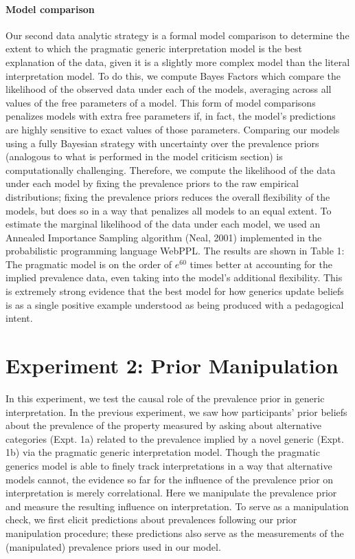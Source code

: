 \documentclass[floatsintext,doc]{apa6}
\let\oldparagraph\paragraph
\renewcommand{\paragraph}[1]{\oldparagraph{#1}\mbox{}}
\begin{document}
\hypertarget{model-comparison}{%
\paragraph{Model comparison}\label{model-comparison}}

Our second data analytic strategy is a formal model comparison to determine the extent to which the pragmatic generic interpretation model is the best explanation of the data, given it is a slightly more complex model than the literal interpretation model.
To do this, we compute Bayes Factors which compare the likelihood of the observed data under each of the models, averaging across all values of the free parameters of a model.
This form of model comparisons penalizes models with extra free parameters if, in fact, the model's predictions are highly sensitive to exact values of those parameters.
Comparing our models using a fully Bayesian strategy with uncertainty over the prevalence priors (analogous to what is performed in the model criticism section) is computationally challenging.
Therefore, we compute the likelihood of the data under each model by fixing the prevalence priors to the raw empirical distributions; fixing the prevalence priors reduces the overall flexibility of the models, but does so in a way that penalizes all models to an equal extent.
To estimate the marginal likelihood of the data under each model, we used an Annealed Importance Sampling algorithm (Neal, 2001) implemented in the probabilistic programming language WebPPL.
The results are shown in Table 1: The pragmatic model is on the order of \(e^{60}\) times better at accounting for the implied prevalence data, even taking into the model's additional flexibility.
This is extremely strong evidence that the best model for how generics update beliefs is as a single positive example understood as being produced with a pedagogical intent.



\hypertarget{experiment-2-prior-manipulation}{%
\section{Experiment 2: Prior Manipulation}\label{experiment-2-prior-manipulation}}

In this experiment, we test the causal role of the prevalence prior in generic interpretation.
In the previous experiment, we saw how participants' prior beliefs about the prevalence of the property measured by asking about alternative categories (Expt. 1a) related to the prevalence implied by a novel generic (Expt. 1b) via the pragmatic generic interpretation model.
Though the pragmatic generics model is able to finely track interpretations in a way that alternative models cannot, the evidence so far for the influence of the prevalence prior on interpretation is merely correlational.
Here we manipulate the prevalence prior and measure the resulting influence on interpretation.
To serve as a manipulation check, we first elicit predictions about prevalences following our prior manipulation procedure; these predictions also serve as the measurements of the (manipulated) prevalence priors used in our model.
\end{document}
